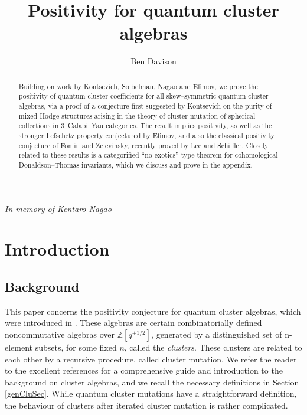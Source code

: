 \documentclass[a4paper,10pt]{amsart}
\begin{document}
\title[Positivity for quantum cluster algebras]{Positivity for quantum cluster algebras}
\author{Ben Davison}


\maketitle
\vspace{-0.2in}
\begin{center} 
{\it In memory of Kentaro Nagao}
\end{center}
\begin{abstract}
Building on work by Kontsevich, Soibelman, Nagao and Efimov, we prove the positivity of quantum cluster coefficients for all skew--symmetric quantum cluster algebras, via a proof of a conjecture first suggested by Kontsevich on the purity of mixed Hodge structures arising in the theory of cluster mutation of spherical collections in 3--Calabi--Yau categories. The result implies positivity, as well as the stronger Lefschetz property conjectured by Efimov, and also the classical positivity conjecture of Fomin and Zelevinsky, recently proved by Lee and Schiffler.  Closely related to these results is a categorified ``no exotics'' type theorem for cohomological Donaldson--Thomas invariants, which we discuss and prove in the appendix.
\end{abstract}
\tableofcontents

\section{Introduction}
\subsection{Background}
This paper concerns the positivity conjecture for quantum cluster algebras, which were introduced in \cite{BZ05}.  These algebras are certain combinatorially defined noncommutative algebras over $\mathbb{Z}[q^{\pm 1/2}]$, generated by a distinguished set of n-element subsets, for some fixed $n$, called the \textit{clusters}.  These clusters are related to each other by a recursive procedure, called cluster mutation.  We refer the reader to the excellent references \cite{Ke375,Keller10} for a comprehensive guide and introduction to the background on cluster algebras, and we recall the necessary definitions in Section \ref{genCluSec}.  While quantum cluster mutations have a straightforward definition, the behaviour of clusters after iterated cluster mutation is rather complicated.  
\end{document}
